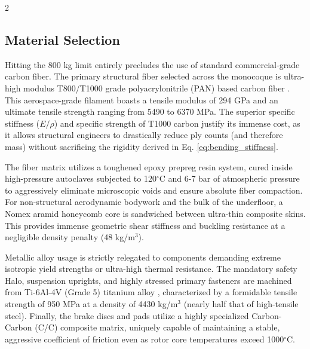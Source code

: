 \begin{multicols}{2}
\subsection{Material Selection}

Hitting the 800 kg limit entirely precludes the use of standard commercial-grade carbon fiber. The primary structural fiber selected across the monocoque is ultra-high modulus T800/T1000 grade polyacrylonitrile (PAN) based carbon fiber \cite{cfrp_materials_lit}. This aerospace-grade filament boasts a tensile modulus of 294 GPa and an ultimate tensile strength ranging from 5490 to 6370 MPa. The superior specific stiffness ($E/\rho$) and specific strength of T1000 carbon justify its immense cost, as it allows structural engineers to drastically reduce ply counts (and therefore mass) without sacrificing the rigidity derived in Eq. \ref{eq:bending_stiffness}.

The fiber matrix utilizes a toughened epoxy prepreg resin system, cured inside high-pressure autoclaves subjected to 120$^\circ$C and 6-7 bar of atmospheric pressure to aggressively eliminate microscopic voids and ensure absolute fiber compaction. For non-structural aerodynamic bodywork and the bulk of the underfloor, a Nomex aramid honeycomb core is sandwiched between ultra-thin composite skins. This provides immense geometric shear stiffness and buckling resistance at a negligible density penalty (48 kg/m$^3$).

Metallic alloy usage is strictly relegated to components demanding extreme isotropic yield strengths or ultra-high thermal resistance. The mandatory safety Halo, suspension uprights, and highly stressed primary fasteners are machined from Ti-6Al-4V (Grade 5) titanium alloy \cite{ti6al4v_specs_lit}, characterized by a formidable tensile strength of 950 MPa at a density of 4430 kg/m$^3$ (nearly half that of high-tensile steel). Finally, the brake discs and pads utilize a highly specialized Carbon-Carbon (C/C) composite matrix, uniquely capable of maintaining a stable, aggressive coefficient of friction even as rotor core temperatures exceed 1000$^\circ$C.
\end{multicols}

